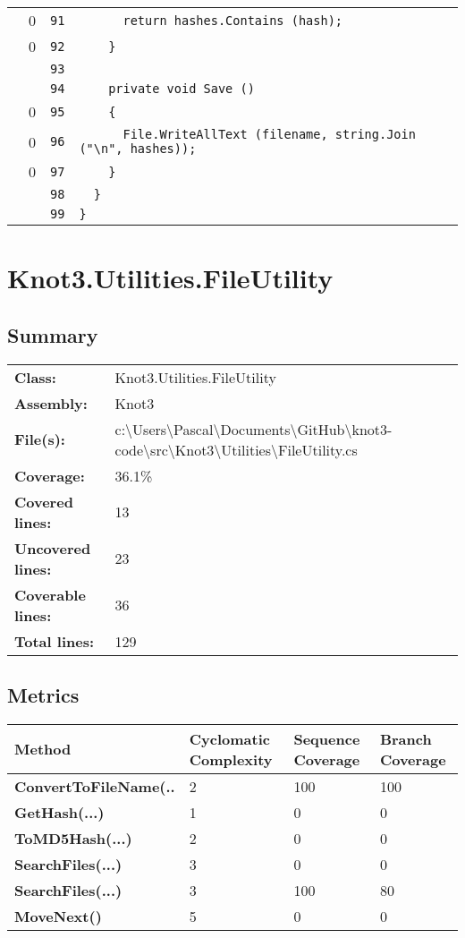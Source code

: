 \documentclass[a4paper,10pt]{article}
\begin{document}
\begin{longtable}[l]{lrrl}
\cellcolor{red} & 0 & \verb~91~ & \verb~      return hashes.Contains (hash);~\\
\cellcolor{red} & 0 & \verb~92~ & \verb~    }~\\
\cellcolor{gray} &  & \verb~93~ & \verb~~\\
\cellcolor{gray} &  & \verb~94~ & \verb~    private void Save ()~\\
\cellcolor{red} & 0 & \verb~95~ & \verb~    {~\\
\cellcolor{red} & 0 & \verb~96~ & \verb~      File.WriteAllText (filename, string.Join ("\n", hashes));~\\
\cellcolor{red} & 0 & \verb~97~ & \verb~    }~\\
\cellcolor{gray} &  & \verb~98~ & \verb~  }~\\
\cellcolor{gray} &  & \verb~99~ & \verb~}~\\
\end{longtable}
\newpage
\section{Knot3.Utilities.FileUtility}
\subsection{Summary}
\begin{longtable}[l]{ll}
\textbf{Class:} & Knot3.Utilities.FileUtility\\
\textbf{Assembly:} & Knot3\\
\textbf{File(s):} & \begin{minipage}[t]{12cm}{c:\textbackslash Users\textbackslash Pascal\textbackslash Documents\textbackslash GitHub\textbackslash knot3-code\textbackslash src\textbackslash Knot3\textbackslash Utilities\textbackslash FileUtility.cs}\end{minipage} \\
\textbf{Coverage:} & 36.1\%\\
\textbf{Covered lines:} & 13\\
\textbf{Uncovered lines:} & 23\\
\textbf{Coverable lines:} & 36\\
\textbf{Total lines:} & 129\\
\end{longtable}
\subsection{Metrics}
\begin{longtable}[l]{|l|l|l|l|}
\hline
\textbf{Method} & \textbf{Cyclomatic Complexity} & \textbf{Sequence Coverage} & \textbf{Branch Coverage}\\
\hline
\textbf{ConvertToFileName(..} & 2 & 100 & 100\\
\hline
\textbf{GetHash(...)} & 1 & 0 & 0\\
\hline
\textbf{ToMD5Hash(...)} & 2 & 0 & 0\\
\hline
\textbf{SearchFiles(...)} & 3 & 0 & 0\\
\hline
\textbf{SearchFiles(...)} & 3 & 100 & 80\\
\hline
\textbf{MoveNext()} & 5 & 0 & 0\\
\hline
\end{longtable}
\end{document}
